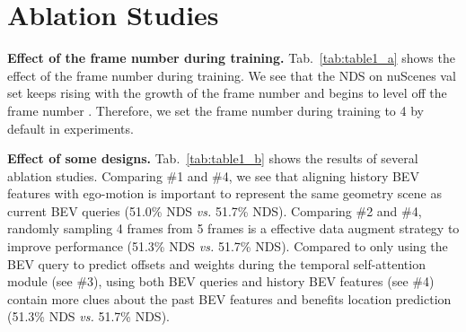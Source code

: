 \documentclass{article}
\begin{document}
\iffalse
\section{Zero-Shot Transfer}

We train BEVFormer on nuScenes~\cite{caesar2020nuscenes} data but evaluate the model on Waymo Open Dataset on  3D object detection task. This is highly challenging due to the different domains, different perception ranges, and different cameras (including different intrinsics and extrinsic, different number of cameras, different horizontal FOV). 
With nuScenes metrics, BEVFormer achieves 7.6\% NDS on vehicle category, much less than the 42.6\% NDS that obtains by training with Waymo Open Dataset. As shown in Fig.~\ref{fig:waymo_zero_shot},  BEVFormer can detect good results in some scenes. However, overall it generates too many false-positive results and has a very low recall. This challenging task still needs more exploration in future work.
\begin{figure}[h]
\centering
\texttt{[image: img/waymo\_zero\_shot.pdf]}
\caption{Visualization results on Waymo Open Dataset. The yellow and blue bounding boxes are ground truth and our predicted results, respectively, and the confidence score threshold is 0.1.
We only train BEVFormer with nuScenes trainging data. BEVFormer can detect some reasonable bounding boxes.}
\label{fig:waymo_zero_shot}

\end{figure}
\fi

\section{Ablation Studies}

\noindent\textbf{Effect of the frame number during training.} Tab.~\ref{tab:table1_a} shows the effect of the frame number during training. We see that the NDS on nuScenes val set keeps
rising with the growth of the frame number and begins to level off the frame number . Therefore, we set the frame number during training to 4 by default in experiments.



\noindent\textbf{Effect of some designs.} Tab.~\ref{tab:table1_b} shows the results of several ablation studies. Comparing \#1 and \#4, we see that aligning history BEV features with ego-motion is important to represent the same geometry scene as current BEV queries (51.0\% NDS \emph{vs.} 51.7\% NDS). Comparing \#2 and \#4, randomly sampling 4 frames from 5 frames is a effective data augment strategy to improve performance (51.3\% NDS \emph{vs.} 51.7\% NDS). Compared to only using the BEV query to predict offsets and weights during the temporal self-attention module (see \#3), using both BEV queries and history BEV features (see \#4) contain more clues about the past BEV features and benefits location prediction (51.3\% NDS \emph{vs.} 51.7\% NDS).
\end{document}
